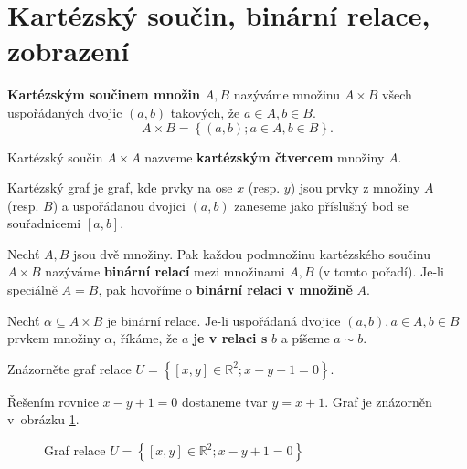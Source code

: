 \section{Kartézský součin, binární relace, zobrazení}
\begin{definition}
  \textbf{Kartézským součinem množin} $A,B$ nazýváme množinu $A\times B$ všech uspořádaných dvojic $(a,b)$ takových, že $a\in A,b\in B$.
  \[
    A \times B = \left \{ (a,b); a\in A,b\in B \right \}.
  \]
\end{definition}

\begin{pozn}
  Kartézský součin $A\times A$ nazveme \textbf{kartézským čtvercem} množiny $A$.
\end{pozn}

\begin{pozn}
  Kartézský graf je graf, kde prvky na ose $x$ (resp. $y$) jsou prvky z množiny $A$ (resp. $B$) a uspořádanou dvojici $(a,b)$ zaneseme jako příslušný bod se souřadnicemi $[a,b].$
\end{pozn}

\begin{definition}
  Nechť $A,B$ jsou dvě množiny. Pak každou podmnožinu kartézského součinu $A\times B$ nazýváme \textbf{binární relací} mezi množinami $A,B$
  (v tomto pořadí). Je-li speciálně $A=B$, pak hovoříme o \textbf{binární relaci v množině} $A$.
\end{definition}

\begin{definition}
Nechť $\alpha\subseteq A\times B$ je binární relace. Je-li uspořádaná dvojice $(a,b), a \in A, b \in B$ prvkem množiny $\alpha$,
říkáme, že $a$ \textbf{je v relaci s} $b$ a píšeme $a \sim b$.
\end{definition}

\begin{priklad}
Znázorněte graf relace $U=\left \{ \left [ x,y \right ]\in \mathbb R^2; x-y+1=0  \right \}. $
\end{priklad}

\begin{reseni}
Řešením rovnice $x-y+1=0$ dostaneme tvar $y=x+1$. Graf je znázorněn v~obrázku \ref{grafx+1}.
\end{reseni}

\begin{figure}[ht!]
	\centering
	\caption{Graf relace $U=\left \{ \left [ x,y \right ]\in \mathbb R^2; x-y+1=0  \right \} $}
	\label{grafx+1}
\end{figure}

